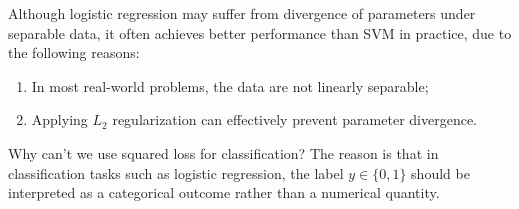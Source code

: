 \documentclass[../main]{subfiles}
\begin{document}
Although logistic regression may suffer from divergence of parameters under separable data, it often achieves better performance than SVM in practice, due to the following reasons:
\begin{enumerate}
  \item In most real-world problems, the data are not linearly separable;
  \item Applying $L_2$ regularization can effectively prevent parameter divergence.
\end{enumerate}
\begin{remark}
  Why can't we use squared loss for classification? The reason is that in classification tasks such as logistic regression, the label $y \in \{0,1\}$ should be interpreted as a categorical outcome rather than a numerical quantity. 
\end{remark}
\vspace{1em}
\end{document}
